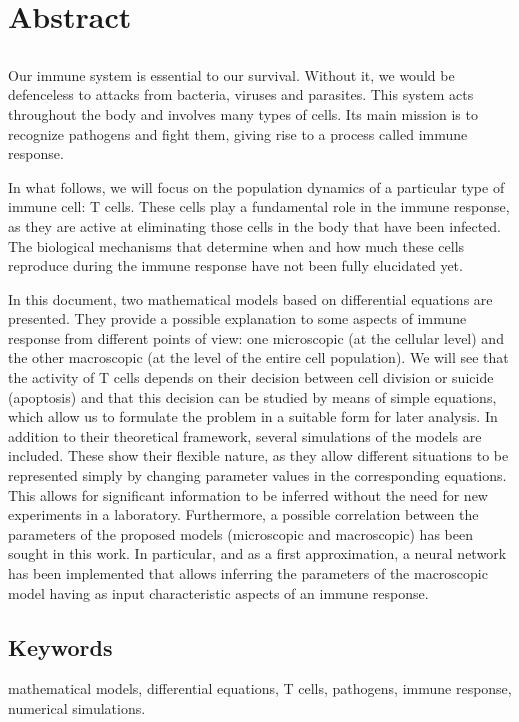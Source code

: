 \chapter*{Abstract}

\section*{}

Our immune system is essential to our survival. Without it, we would be defenceless to attacks from bacteria, viruses and parasites. This system acts throughout the body and involves many types of cells. Its main mission is to recognize pathogens and fight them, giving rise to a process called immune response. 


In what follows, we will focus on the population dynamics of a particular type of immune cell: T cells. These cells play a fundamental role in the immune response, as they are active at eliminating those cells in the body that have been infected. The biological mechanisms that determine when and how much these cells reproduce during the immune response have not been fully elucidated yet. 

In this document, two mathematical models based on differential equations are presented. They provide a possible explanation to some aspects of immune response from different points of view: one microscopic (at the cellular level) and the other macroscopic (at the level of the entire cell population). We will see that the activity of T cells depends on their decision between cell division or suicide (apoptosis) and that this decision can be studied by means of simple equations, which allow us to formulate the problem in a suitable form for later analysis. In addition to their theoretical framework, several simulations of the models are included. These show their flexible nature, as they allow different situations to be represented simply by changing parameter values in the corresponding equations. This allows for significant information to be inferred without the need for new experiments in a laboratory. Furthermore, a possible correlation between the parameters of the proposed models (microscopic and macroscopic) has been sought in this work.  In particular, and as a first approximation, a neural network has been implemented that allows inferring the parameters of the macroscopic model having as input characteristic aspects of an immune response.


\section*{Keywords}

\noindent mathematical models, differential equations, T cells, pathogens, immune response, numerical simulations.

